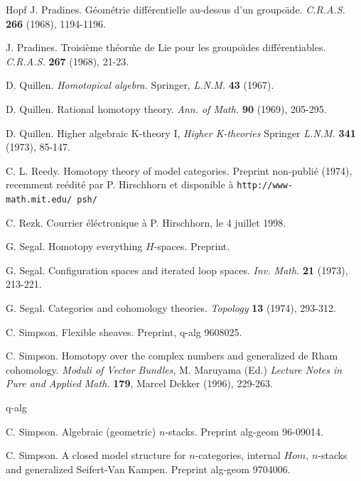 \documentclass[12pt]{article}
\begin{document}
\begin{thebibliography}{Hopf}
J. Pradines. G\'eom\'etrie diff\'erentielle au-dessus d'un
groupo\"{\i}de. {\em C.R.A.S.} {\bf 266} (1968), 1194-1196.



J. Pradines. Troisi\`eme th\'eor\`me de Lie pour les groupo\"{\i}des
diff\'erentiables.
{\em C.R.A.S.} {\bf 267} (1968), 21-23.


D. Quillen. {\em Homotopical algebra.} Springer, {\em L.N.M.} {\bf 43} (1967).

D. Quillen. Rational homotopy theory. {\em Ann. of Math.} {\bf 90} (1969),
205-295.

D. Quillen. Higher algebraic K-theory I, {\em Higher K-theories} Springer {\em
L.N.M.} {\bf 341} (1973), 85-147.

C. L. Reedy. Homotopy theory of model categories. Preprint non-publi\'e (1974),
recemment re\'edit\'e par P. Hirschhorn et disponible \`a \newline
{\tt http://www-math.mit.edu/~psh/}

C. Rezk. Courrier \'el\'ectronique \`a P. Hirschhorn, le 4 juillet 1998.

G. Segal. Homotopy everything $H$-spaces. Preprint.

G. Segal. Configuration spaces and iterated loop spaces. {\em Inv. Math.} {\bf
21} (1973), 213-221.

G. Segal. Categories and cohomology theories. {\em Topology} {\bf 13}
(1974), 293-312.

C. Simpson. Flexible sheaves. Preprint, q-alg 9608025.

C. Simpson. Homotopy over the complex numbers and generalized de Rham
cohomology. {\em Moduli of Vector Bundles}, M. Maruyama (Ed.) {\em Lecture
Notes in Pure and Applied Math.} {\bf 179}, Marcel Dekker (1996), 229-263.


q-alg

C. Simpson. Algebraic (geometric) $n$-stacks. Preprint alg-geom
96-09014.


C. Simpson. A closed model structure for $n$-categories, internal $Hom$,
$n$-stacks and generalized Seifert-Van Kampen. Preprint alg-geom 9704006.


\end{thebibliography}
\end{document}

